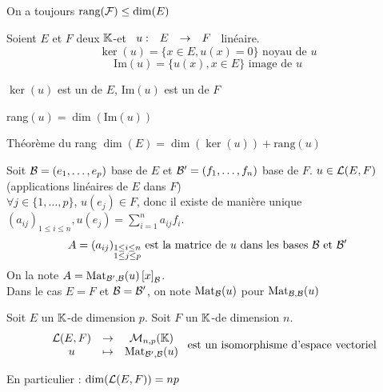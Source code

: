 \documentclass[]{report}
\begin{document}
    \begin{prop}{}{}
        On a toujours $\text{rang}(\mathcal{F})\le \dim(E)$
    \end{prop}

    \begin{df}{}{}
        Soient $E$ et $F$ deux $\mathbb{K}$-\ev et $\begin{array}{ccccc} u : & E & \to & F \end{array}$ linéaire.\\
        \[\ker(u)=\{x\in E,u(x)=0\}\text{ noyau de }u\]
        \[\text{Im}(u)=\{u(x),x\in E\}\text{ image de }u\]
    \end{df}

    \begin{re}{}{}
        $\ker(u)$ est un \sev de $E$, Im$(u)$ est un \sev de $F$
    \end{re}

    \begin{df}{}{}
        rang$(u)=\dim(\text{Im}(u))$
    \end{df}

    \begin{tm}{Théorème du rang}{}
        $\dim(E)=\dim(\ker(u))+\text{rang}(u)$
    \end{tm}

    \begin{re}{}{}
        Soit $\mathcal{B}=(e_1,\ldots,e_p)$ base de $E$ et $\mathcal{B}'=(f_1,\ldots,f_n)$ base de $F$. $u\in \mathcal{L}(E,F)$ (applications linéaires de $E$ dans $F$)\\
        $\forall j\in \{1,\ldots,p\}$, $u(e_j)\in F$, donc il existe de manière unique $\displaystyle{(a_{ij})_{1\le i\le n},u(e_j)=\sum_{i=1}^na_{ij}f_i}$.\\
        \[A=(a_{ij})_{\substack{1\le i\le n\\ 1\le j\le p}}\text{ est la matrice de $u$ dans les bases $\mathcal{B}$ et $\mathcal{B}'$}\]
        On la note $A=\text{Mat}_{\mathcal{B}',\mathcal{B}}(u)\left[x\right]_{\mathcal{B}}$.\\
        Dans le cas $E=F$ et $\mathcal{B}=\mathcal{B}'$, on note $\text{Mat}_{\mathcal{B}}(u)$ pour $\text{Mat}_{\mathcal{B},\mathcal{B}}(u)$
    \end{re}

    \begin{prop}{}{}
        Soit $E$ un $\mathbb{K}$-\ev de dimension $p$. Soit $F$ un $\mathbb{K}$-\ev de dimension $n$.\\
        \[\begin{array}{ccccc} & \mathcal{L}(E,F) & \to & \mathcal{M}_{n,p}(\mathbb{K}) \\ & u & \mapsto & \text{Mat}_{\mathcal{B}',\mathcal{B}}(u) \end{array}\text{ est un isomorphisme d'\text{espace vectoriel} }\]
    \end{prop}

    \begin{re}{}{}
        En particulier : $\dim (\mathcal{L}(E,F))=np$
    \end{re}
\end{document}
